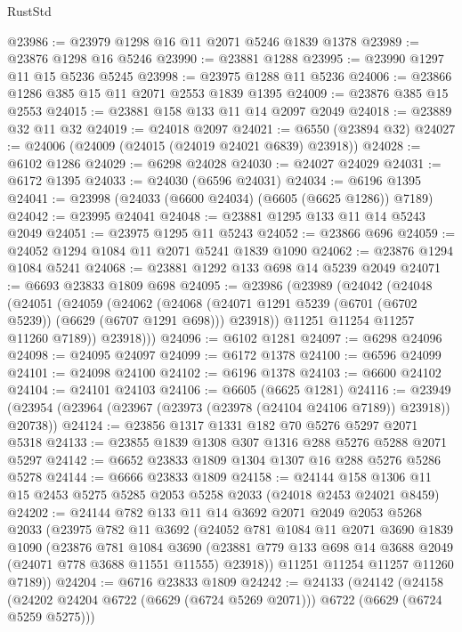 \begin{lexlean}{RustStd}
\begin{coremodule}
@23986 := @23979 @1298 @16 @11 @2071 @5246 @1839 @1378
@23989 := @23876 @1298 @16 @5246
@23990 := @23881 @1288
@23995 := @23990 @1297 @11 @15 @5236 @5245
@23998 := @23975 @1288 @11 @5236
@24006 := @23866 @1286 @385 @15 @11 @2071 @2553 @1839 @1395
@24009 := @23876 @385 @15 @2553
@24015 := @23881 @158 @133 @11 @14 @2097 @2049
@24018 := @23889 @32 @11 @32
@24019 := @24018 @2097
@24021 := @6550 (@23894 @32)
@24027 := @24006 (@24009 (@24015 (@24019 @24021 @6839) @23918))
@24028 := @6102 @1286
@24029 := @6298 @24028
@24030 := @24027 @24029
@24031 := @6172 @1395
@24033 := @24030 (@6596 @24031)
@24034 := @6196 @1395
@24041 := @23998 (@24033 (@6600 @24034) (@6605 (@6625 @1286)) @7189)
@24042 := @23995 @24041
@24048 := @23881 @1295 @133 @11 @14 @5243 @2049
@24051 := @23975 @1295 @11 @5243
@24052 := @23866 @696
@24059 := @24052 @1294 @1084 @11 @2071 @5241 @1839 @1090
@24062 := @23876 @1294 @1084 @5241
@24068 := @23881 @1292 @133 @698 @14 @5239 @2049
@24071 := @6693 @23833 @1809 @698
@24095 := @23986
    (@23989
      (@24042
        (@24048
          (@24051
            (@24059
              (@24062
                (@24068
                  (@24071 @1291 @5239 (@6701 (@6702 @5239)) (@6629 (@6707 @1291 @698)))
                  @23918))
              @11251
              @11254
              @11257
              @11260
              @7189))
          @23918)))
@24096 := @6102 @1281
@24097 := @6298 @24096
@24098 := @24095 @24097
@24099 := @6172 @1378
@24100 := @6596 @24099
@24101 := @24098 @24100
@24102 := @6196 @1378
@24103 := @6600 @24102
@24104 := @24101 @24103
@24106 := @6605 (@6625 @1281)
@24116 := @23949 (@23954 (@23964 (@23967 (@23973 (@23978 (@24104 @24106 @7189)) @23918)) @20738))
@24124 := @23856 @1317 @1331 @182 @70 @5276 @5297 @2071 @5318
@24133 := @23855 @1839 @1308 @307 @1316 @288 @5276 @5288 @2071 @5297
@24142 := @6652 @23833 @1809 @1304 @1307 @16 @288 @5276 @5286 @5278
@24144 := @6666 @23833 @1809
@24158 := @24144 @158 @1306 @11 @15 @2453 @5275 @5285 @2053 @5258 @2033 (@24018 @2453 @24021 @8459)
@24202 := @24144
    @782
    @133
    @11
    @14
    @3692
    @2071
    @2049
    @2053
    @5268
    @2033
    (@23975
      @782
      @11
      @3692
      (@24052
        @781
        @1084
        @11
        @2071
        @3690
        @1839
        @1090
        (@23876
          @781
          @1084
          @3690
          (@23881 @779 @133 @698 @14 @3688 @2049 (@24071 @778 @3688 @11551 @11555) @23918))
        @11251
        @11254
        @11257
        @11260
        @7189))
@24204 := @6716 @23833 @1809
@24242 := @24133
    (@24142
      (@24158 (@24202 @24204 @6722 (@6629 (@6724 @5269 @2071))) @6722 (@6629 (@6724 @5259 @5275)))

\end{coremodule}
\end{lexlean}
